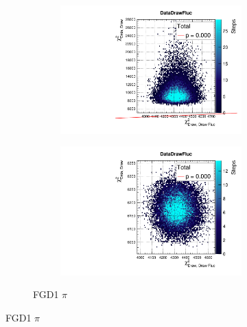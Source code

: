 \begin{figure}[h]
\begin{subfigure}[t]{\textwidth}
\begin{subfigure}[t]{0.24\textwidth}
			\includegraphics[width=\textwidth, trim={0mm 0mm 0mm 8mm}, clip,page=74]{figures/mach3/2018/data/2018a_FixedCov_RedCov_Mpi_Data_merge_PriorPred_procs}
		\end{subfigure}
		\begin{subfigure}[t]{0.24\textwidth}
			\includegraphics[width=\textwidth, trim={0mm 0mm 0mm 8mm}, clip,page=74]{figures/mach3/2018/data/2018a_FixedCov_RedCov_Mpi_Data_merge_PostPredStore_FullLLH_procs}
		\end{subfigure}
		\caption{FGD1 $\pi$}
	\end{subfigure}
	

\end{figure}
